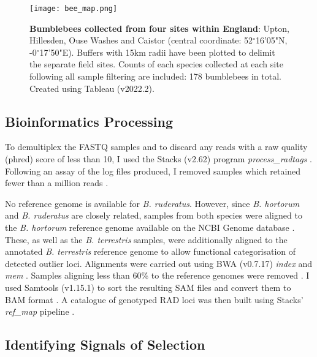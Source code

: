 \documentclass[12pt]{article}
\begin{document}
\begin{linenumbers}
    	\begin{figure}[ht!]
    		\centering
    		\texttt{[image: bee\_map.png]}
    		\captionsetup{width=0.88\linewidth}
    		\caption{\textbf{Bumblebees collected from four sites within England}: Upton, Hillesden, Ouse Washes and Caistor (central coordinate: 52$^{\circ}$16'05"N, -0$^{\circ}$17'50"E). Buffers with 15km radii have been plotted to delimit the separate field sites. Counts of each species collected at each site following all sample filtering are included: 178 bumblebees in total. Created using Tableau (v2022.2).}
    		\label{fig:Bee sample sites}
    	\end{figure}
    	
    	
    	\subsection{Bioinformatics Processing}
    	
    	To demultiplex the FASTQ samples and to discard any reads with a raw quality (phred) score of less than 10, I used the Stacks (v2.62) program \emph{process\_radtags} \citep{catchen_stacks_2013}. Following an assay of the log files produced, I removed samples which retained fewer than a million reads \citep{rochette_deriving_2017, rivera-colon_population_2021}. 
    	
    	No reference genome is available for \emph{B. ruderatus}. However, since \emph{B. hortorum} and \emph{B. ruderatus} are closely related, samples from both species were aligned to the \emph{B. hortorum} reference genome available on the NCBI Genome database \citep{ellis_delineating_2005, ncbi_iybomhort11_2021, sayers_database_2022}.
    	These, as well as the \emph{B. terrestris} samples, were additionally aligned to the annotated \emph{B. terrestris} reference genome \citep{ncbi_iybomterr12_2022} to allow functional categorisation of detected outlier loci. Alignments were carried out using BWA (v0.7.17) \emph{index} and \emph{mem} \citep{li_fast_2009, li2013aligning}.
		Samples aligning less than 60\% to the reference genomes were removed \citep{rochette_deriving_2017}.
    	I used Samtools (v1.15.1) to sort the resulting SAM files and convert them to BAM format \citep{danecek_twelve_2021}. A catalogue of genotyped RAD loci was then built using Stacks' \emph{ref\_map} pipeline \citep{catchen_stacks_2013}. 

		
		\subsection{Identifying Signals of Selection}
		

\end{linenumbers}
\end{document}
